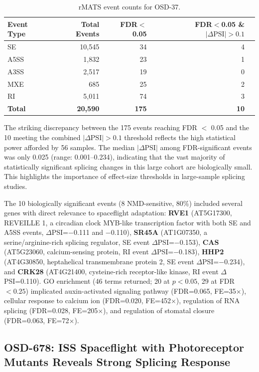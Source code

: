 \documentclass[12pt,a4paper]{article}
\begin{document}
\begin{table}[h]
\centering
\caption{rMATS event counts for OSD-37.}
\label{tab:osd37_events}
\begin{tabular}{lrrrr}
\toprule
Event Type & Total Events & FDR$<$0.05 & FDR$<$0.05 \& $|\Delta\text{PSI}|>0.1$ \\
\midrule
SE & 10,545 & 34 & 4 \\
A5SS & 1,832 & 23 & 1 \\
A3SS & 2,517 & 19 & 0 \\
MXE & 685 & 25 & 2 \\
RI & 5,011 & 74 & 3 \\
\textbf{Total} & \textbf{20,590} & \textbf{175} & \textbf{10} \\
\bottomrule
\end{tabular}
\end{table}

The striking discrepancy between the 175 events reaching FDR $<$ 0.05 and the 10 meeting the combined $|\Delta\text{PSI}| > 0.1$ threshold reflects the high statistical power afforded by 56 samples. The median $|\Delta\text{PSI}|$ among FDR-significant events was only 0.025 (range: 0.001--0.234), indicating that the vast majority of statistically significant splicing changes in this large cohort are biologically small. This highlights the importance of effect-size thresholds in large-sample splicing studies.

The 10 biologically significant events (8 NMD-sensitive, 80\%) included several genes with direct relevance to spaceflight adaptation: \textbf{RVE1} (AT5G17300, REVEILLE 1, a circadian clock MYB-like transcription factor with both SE and A5SS events, $\Delta$PSI=$-$0.111 and $-$0.110), \textbf{SR45A} (AT1G07350, a serine/arginine-rich splicing regulator, SE event $\Delta$PSI=$-$0.153), \textbf{CAS} (AT5G23060, calcium-sensing protein, RI event $\Delta$PSI=$-$0.183), \textbf{HHP2} (AT4G30850, heptahelical transmembrane protein 2, SE event $\Delta$PSI=$-$0.234), and \textbf{CRK28} (AT4G21400, cysteine-rich receptor-like kinase, RI event $\Delta$PSI=0.110). GO enrichment (46 terms returned; 20 at $p<0.05$, 29 at FDR$<0.25$) implicated auxin-activated signaling pathway (FDR=0.065, FE=35$\times$), cellular response to calcium ion (FDR=0.020, FE=452$\times$), regulation of RNA splicing (FDR=0.028, FE=205$\times$), and regulation of stomatal closure (FDR=0.063, FE=72$\times$).

\subsection{OSD-678: ISS Spaceflight with Photoreceptor Mutants Reveals Strong Splicing Response}
\end{document}
